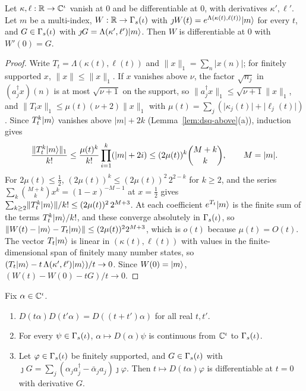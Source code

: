 \begin{veteenv}
\begin{lemma}\label{lem:dsq-deriv}
Let $\kappa,\ell:\mathbb R\to\mathbb C^\iota$ vanish at $0$ and be differentiable at $0$, with derivatives $\kappa',\ell'$. Let $m$ be a
multi-index, $W:\mathbb R\to\Gamma_s(\iota)$ with $\jmath W(t)=e^{\Lambda(\kappa(t),\ell(t))}\lvert m\rangle$ for every $t$, and $G\in\Gamma_s(\iota)$ with
$\jmath G=\Lambda(\kappa',\ell')\lvert m\rangle$. Then $W$ is differentiable at $0$ with $W'(0)=G$.
\end{lemma}

\begin{proof}
Write $T_t=\Lambda(\kappa(t),\ell(t))$ and $\lVert x\rVert_1=\sum_n\lvert x(n)\rvert$; for finitely supported $x$,
$\lVert x\rVert\le\lVert x\rVert_1$. If $x$ vanishes above $\nu$, the factor $\sqrt{n_j}$ in $(a_j^\dagger x)(n)$ is at most
$\sqrt{\nu+1}$ on the support, so $\lVert a_j^\dagger x\rVert_1\le\sqrt{\nu+1}\lVert x\rVert_1$, and
$\lVert T_tx\rVert_1\le\mu(t)(\nu+2)\lVert x\rVert_1$ with $\mu(t)=\sum_j(\lvert\kappa_j(t)\rvert+\lvert\ell_j(t)\rvert)$. Since
$T_t^k\lvert m\rangle$ vanishes above $\lvert m\rvert+2k$ (Lemma~\ref{lem:dsq-above}(a)), induction gives
\[
 \frac{\lVert T_t^k\lvert m\rangle\rVert_1}{k!}\le\frac{\mu(t)^k}{k!}\prod_{i=1}^{k}(\lvert m\rvert+2i)\le(2\mu(t))^k\binom{M+k}k,
 \qquad M=\lvert m\rvert .
\]
For $2\mu(t)\le\frac12$, $(2\mu(t))^k\le(2\mu(t))^2\,2^{2-k}$ for $k\ge2$, and the series
$\sum_k\binom{M+k}kx^k=(1-x)^{-M-1}$ at $x=\frac12$ gives
$\sum_{k\ge2}\lVert T_t^k\lvert m\rangle\rVert/k!\le(2\mu(t))^2\,2^{M+3}$. At each coefficient $e^{T_t}\lvert m\rangle$ is the finite sum of the
terms $T_t^k\lvert m\rangle/k!$, and these converge absolutely in $\Gamma_s(\iota)$, so
$\lVert W(t)-\lvert m\rangle-T_t\lvert m\rangle\rVert\le(2\mu(t))^22^{M+3}$, which is $o(t)$ because $\mu(t)=O(t)$. The vector $T_t\lvert m\rangle$ is
linear in $(\kappa(t),\ell(t))$ with values in the finite-dimensional span of finitely many number states, so
$(T_t\lvert m\rangle-t\,\Lambda(\kappa',\ell')\lvert m\rangle)/t\to0$. Since $W(0)=\lvert m\rangle$, $(W(t)-W(0)-tG)/t\to0$.
\end{proof}

\begin{theorem}\label{thm:dsq-disp-group}
Fix $\alpha\in\mathbb C^\iota$.
\begin{enumerate}
\item[(a)] $D(t\alpha)D(t'\alpha)=D((t+t')\alpha)$ for all real $t,t'$.
\item[(b)] For every $\psi\in\Gamma_s(\iota)$, $\alpha\mapsto D(\alpha)\psi$ is continuous from $\mathbb C^\iota$ to $\Gamma_s(\iota)$.
\item[(c)] Let $\varphi\in\Gamma_s(\iota)$ be finitely supported, and $G\in\Gamma_s(\iota)$ with $\jmath G=\sum_j(\alpha_ja_j^\dagger-\bar\alpha_ja_j)\jmath\varphi$.
Then $t\mapsto D(t\alpha)\varphi$ is differentiable at $t=0$ with derivative $G$.
\end{enumerate}
\end{theorem}


\end{veteenv}
